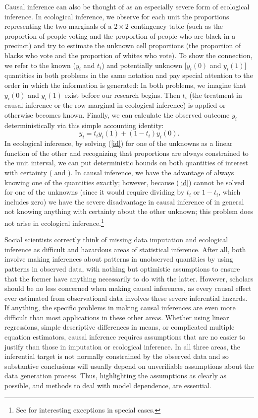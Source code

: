 \documentclass[11pt,titlepage]{article}
\begin{document}
Causal inference can also be thought of as an especially severe form
of ecological inference.  In ecological inference, we observe for each
unit the proportions representing the two marginals of a $2\times 2$
contingency table (such as the proportion of people voting and the
proportion of people who are black in a precinct) and try to estimate
the unknown cell proportions (the proportion of blacks who vote and
the proportion of whites who vote).  To show the connection, we refer
to the known ($y_i$ and $t_i$) and potentially unknown [$y_i(0)$ and
$y_i(1)$] quantities in both problems in the same notation and pay
special attention to the order in which the information is generated:
In both problems, we imagine that $y_i(0)$ and $y_i(1)$ exist
before our research begins.  Then $t_i$ (the treatment in
causal inference or the row marginal in ecological inference) is
applied or otherwise becomes known.  Finally, we can calculate the
observed outcome $y_i$ deterministically via this simple accounting
identity:
\begin{equation}
  \label{id}
  y_i = t_iy_i(1) + (1-t_i)y_i(0).
\end{equation}
In ecological inference, by solving (\ref{id}) for one of the unknowns
as a linear function of the other and recognizing that proportions are
always constrained to the unit interval, we can put deterministic
bounds on both quantities of interest with certainty
(\citealp{DunDav53} and \citealp[][ch.5]{King97}).  In causal
inference, we have the advantage of always knowing one of the
quantities exactly; however, because (\ref{id}) cannot be solved for
one of the unknowns (since it would require dividing by $t_i$ or
$1-t_i$, which includes zero) we have the severe disadvantage in
causal inference of in general not knowing anything with certainty
about the other unknown; this problem does not arise in ecological
inference.\footnote{See \citet{Manski95} for interesting exceptions in
  special cases.}

Social scientists correctly think of missing data imputation and
ecological inference as difficult and hazardous areas of statistical
inference.  After all, both involve making inferences about patterns
in unobserved quantities by using patterns in observed data, with
nothing but optimistic assumptions to ensure that the former have
anything necessarily to do with the latter.  However, scholars should
be no less concerned when making causal inferences, as every causal
effect ever estimated from observational data involves these severe
inferential hazards.  If anything, the specific problems in making
causal inferences are even more difficult than most applications in
these other areas.  Whether using linear regressions, simple
descriptive differences in means, or complicated multiple equation
estimators, causal inference requires assumptions that are no easier
to justify than those in imputation or ecological inference.  In all
three areas, the inferential target is not normally constrained by the
observed data and so substantive conclusions will usually depend on
unverifiable assumptions about the data generation process.  Thus,
highlighting the assumptions as clearly as possible, and methods to
deal with model dependence, are essential.
\end{document}
